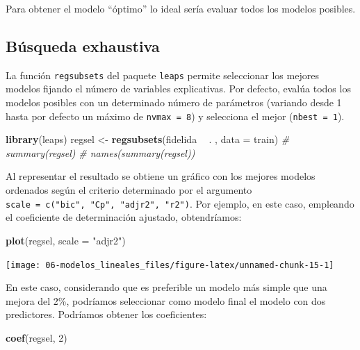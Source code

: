 \documentclass[
]{book}
\newenvironment{Shaded}{\begin{snugshade}}{\end{snugshade}}
\newcommand{\CommentTok}[1]{\textcolor[rgb]{0.56,0.35,0.01}{\textit{#1}}}
\newcommand{\DataTypeTok}[1]{\textcolor[rgb]{0.13,0.29,0.53}{#1}}
\newcommand{\DecValTok}[1]{\textcolor[rgb]{0.00,0.00,0.81}{#1}}
\newcommand{\KeywordTok}[1]{\textcolor[rgb]{0.13,0.29,0.53}{\textbf{#1}}}
\newcommand{\NormalTok}[1]{#1}
\newcommand{\OperatorTok}[1]{\textcolor[rgb]{0.81,0.36,0.00}{\textbf{#1}}}
\newcommand{\StringTok}[1]{\textcolor[rgb]{0.31,0.60,0.02}{#1}}
\theoremstyle{break}
\theoremstyle{definition}
\theoremstyle{definition}
\theoremstyle{definition}
\theoremstyle{remark}
\begin{document}
Para obtener el modelo ``óptimo'' lo ideal sería evaluar todos los modelos posibles.

\hypertarget{buxfasqueda-exhaustiva}{%
\subsection{Búsqueda exhaustiva}\label{buxfasqueda-exhaustiva}}

La función \texttt{regsubsets} del paquete \texttt{leaps} permite seleccionar los mejores modelos
fijando el número de variables explicativas.
Por defecto, evalúa todos los modelos posibles con un determinado número de
parámetros (variando desde 1 hasta por defecto un máximo de \texttt{nvmax\ =\ 8})
y selecciona el mejor (\texttt{nbest\ =\ 1}).

\begin{Shaded}
\begin{Highlighting}[]
\KeywordTok{library}\NormalTok{(leaps)}
\NormalTok{regsel <-}\StringTok{ }\KeywordTok{regsubsets}\NormalTok{(fidelida }\OperatorTok{~}\StringTok{ }\NormalTok{. , }\DataTypeTok{data =}\NormalTok{ train)}
\CommentTok{# summary(regsel)}
\CommentTok{# names(summary(regsel))}
\end{Highlighting}
\end{Shaded}

Al representar el resultado se obtiene un gráfico con los mejores modelos ordenados
según el criterio determinado por el argumento \texttt{scale\ =\ c("bic",\ "Cp",\ "adjr2",\ "r2")}.
Por ejemplo, en este caso, empleando el coeficiente de determinación ajustado, obtendríamos:

\begin{Shaded}
\begin{Highlighting}[]
\KeywordTok{plot}\NormalTok{(regsel, }\DataTypeTok{scale =} \StringTok{"adjr2"}\NormalTok{)}
\end{Highlighting}
\end{Shaded}

\begin{center}\texttt{[image: 06-modelos\_lineales\_files/figure-latex/unnamed-chunk-15-1]} \end{center}

En este caso, considerando que es preferible un modelo más simple que una mejora del 2\%, podríamos seleccionar como modelo final el modelo con dos predictores.
Podríamos obtener los coeficientes:

\begin{Shaded}
\begin{Highlighting}[]
\KeywordTok{coef}\NormalTok{(regsel, }\DecValTok{2}\NormalTok{)}
\end{Highlighting}
\end{Shaded}
\end{document}
